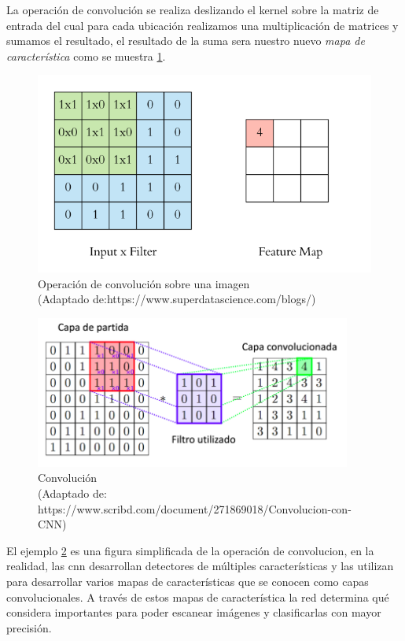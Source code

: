 La operación de convolución se realiza deslizando el kernel sobre la matriz de entrada del cual para cada ubicación realizamos una multiplicación de matrices y sumamos el resultado, el resultado de la suma sera nuestro nuevo \textit{mapa de característica} como se muestra \ref{fig: f_maps2}.

\begin{figure}[H]
 \centering
  \includegraphics[scale=0.4,keepaspectratio=true,clip=true]{imagenes/MarcoTeorico/convoluc_2.png}
  \caption{Operación de convolución sobre una imagen \\ (Adaptado de:https://www.superdatascience.com/blogs/)}\label{fig: f_maps2} 
\end{figure}


\begin{figure}[H]
 \centering
  \includegraphics[height=5cm,keepaspectratio=true,clip=true]{imagenes/MarcoTeorico/convolucion.png}
  \caption{Convolución \\ (Adaptado de: https://www.scribd.com/document/271869018/Convolucion-con-CNN)} \label{Fig:convolucion}
\end{figure}

El ejemplo \ref{Fig:convolucion} es una figura  simplificada de la operación de convolucion, en la realidad, las \ac{cnn} desarrollan detectores de múltiples características y las utilizan para desarrollar varios mapas de características que se conocen como capas convolucionales. A través de estos mapas de característica la red determina qué  considera importantes para poder escanear imágenes y clasificarlas con mayor precisión.
